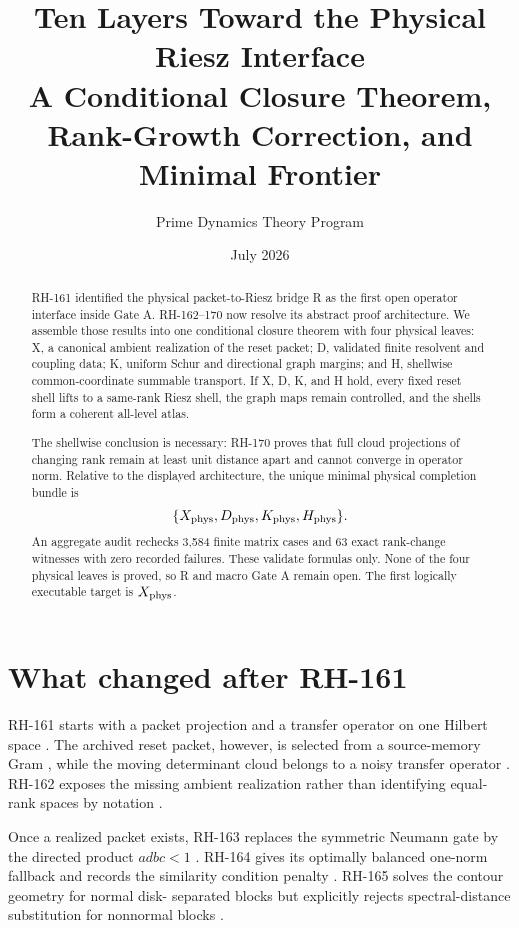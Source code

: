 \documentclass[12pt]{article}
\title{Ten Layers Toward the Physical Riesz Interface\\\large A Conditional Closure Theorem, Rank-Growth Correction, and Minimal Frontier}
\author{Prime Dynamics Theory Program}
\date{July 2026}
\begin{document}
\maketitle
\begin{abstract}
RH-161 identified the physical packet-to-Riesz bridge R as the first open
operator interface inside Gate A.  RH-162--170 now resolve its abstract proof
architecture.  We assemble those results into one conditional closure
theorem with four physical leaves: X, a canonical ambient realization of the
reset packet; D, validated finite resolvent and coupling data; K, uniform
Schur and directional graph margins; and H, shellwise common-coordinate
summable transport.  If X, D, K, and H hold, every fixed reset shell lifts to
a same-rank Riesz shell, the graph maps remain controlled, and the shells
form a coherent all-level atlas.

The shellwise conclusion is necessary: RH-170 proves that full cloud
projections of changing rank remain at least unit distance apart and cannot
converge in operator norm.  Relative to the displayed architecture, the
unique minimal physical completion bundle is
\[
 \{X_{\rm phys},D_{\rm phys},K_{\rm phys},H_{\rm phys}\}.
\]
An aggregate audit rechecks 3,584 finite matrix cases and 63 exact rank-change
witnesses with zero recorded failures.  These validate formulas only.  None
of the four physical leaves is proved, so R and macro Gate A remain open.
The first logically executable target is $X_{\rm phys}$.
\end{abstract}

\section{What changed after RH-161}
RH-161 starts with a packet projection and a transfer operator on one Hilbert
space \citep{WangRH161}.  The archived reset packet, however, is selected
from a source-memory Gram \citep{WangRH160}, while the moving determinant
cloud belongs to a noisy transfer operator \citep{WangRH80}.  RH-162 exposes
the missing ambient realization rather than identifying equal-rank spaces by
notation \citep{WangRH162}.

Once a realized packet exists, RH-163 replaces the symmetric Neumann gate by
the directed product $adbc<1$ \citep{WangRH163}.  RH-164 gives its optimally
balanced one-norm fallback and records the similarity condition penalty
\citep{WangRH164}.  RH-165 solves the contour geometry for normal disk-
separated blocks but explicitly rejects spectral-distance substitution for
nonnormal blocks \citep{WangRH165,TrefethenEmbree2005}.
\end{document}
